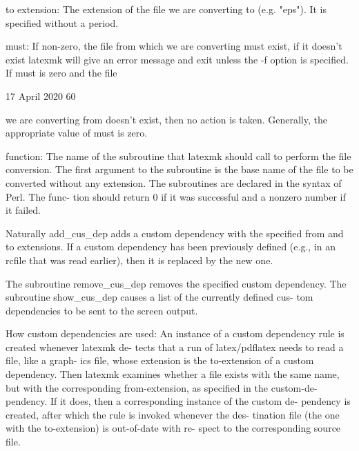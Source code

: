        to extension:
              The extension of the file we are converting to (e.g. "eps").  It
              is specified without a period.

       must:  If non-zero, the file from which we are converting  must  exist,
              if  it doesn't exist latexmk will give an error message and exit
              unless the -f option is specified.  If must is zero and the file



                                 17 April 2020                              60








              we  are  converting from doesn't exist, then no action is taken.
              Generally, the appropriate value of must is zero.

       function:
              The name of the subroutine that latexmk should call  to  perform
              the  file  conversion.   The first argument to the subroutine is
              the base name of the file to be converted without any extension.
              The  subroutines  are declared in the syntax of Perl.  The func-
              tion should return 0 if it was successful and a  nonzero  number
              if it failed.


       Naturally  add_cus_dep adds a custom dependency with the specified from
       and to extensions.  If a custom dependency has been previously  defined
       (e.g.,  in an rcfile that was read earlier), then it is replaced by the
       new one.

       The subroutine remove_cus_dep removes the specified custom  dependency.
       The subroutine show_cus_dep causes a list of the currently defined cus-
       tom dependencies to be sent to the screen output.


   How custom dependencies are used:
       An instance of a custom dependency rule is created whenever latexmk de-
       tects  that a run of latex/pdflatex needs to read a file, like a graph-
       ics file, whose extension is the to-extension of a  custom  dependency.
       Then  latexmk  examines  whether  a file exists with the same name, but
       with the corresponding from-extension, as specified in  the  custom-de-
       pendency.   If it does, then a corresponding instance of the custom de-
       pendency is created, after which the rule is invoked whenever the  des-
       tination  file  (the one with the to-extension) is out-of-date with re-
       spect to the corresponding source file.


